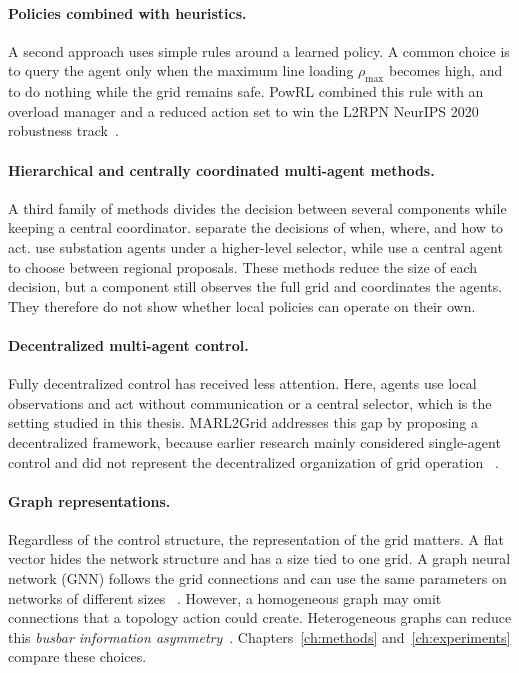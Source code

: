 \paragraph{Policies combined with heuristics.}
A second approach uses simple rules around a learned policy. A common choice is
to query the agent only when the maximum line loading $\rho_{\max}$ becomes
high, and to do nothing while the grid remains safe. PowRL combined this rule
with an overload manager and a reduced action set to win the L2RPN NeurIPS 2020
robustness track~\cite{chauhan2023powrl}. %

\paragraph{Hierarchical and centrally coordinated multi-agent methods.}
A third family of methods divides the decision between several components while
keeping a central coordinator. \textcite{manczak2023hrl} separate the decisions
of when, where, and how to act. \textcite{vandersar2023hmarl} use substation
agents under a higher-level selector, while \textcite{demol2025ccma} use a
central agent to choose between regional proposals. These methods reduce the
size of each decision, but a component still observes the full grid and
coordinates the agents. They therefore do not show whether local policies can
operate on their own.

\paragraph{Decentralized multi-agent control.}
Fully decentralized control has received less attention. Here, agents use local
observations and act without communication or a central selector, which is the
setting studied in this thesis. MARL2Grid addresses this gap by proposing a 
decentralized framework, because
earlier research mainly considered single-agent control and did not represent
the decentralized organization of grid operation
~\cite{marchesini2026marl2grid}.

\paragraph{Graph representations.}
Regardless of the control structure, the representation of the grid matters. A
flat vector hides the network structure and has a size tied to one grid. A graph
neural network (GNN) follows the grid connections and can use the same
parameters on networks of different sizes
~\cite{kipf2017gcn,velickovic2018gat,xu2018how}. However, a homogeneous graph may
omit connections that a topology action could create. Heterogeneous graphs can
reduce this \emph{busbar information asymmetry}~\cite{dejong2025gnntopo}.
Chapters~\ref{ch:methods} and~\ref{ch:experiments} compare these choices.

